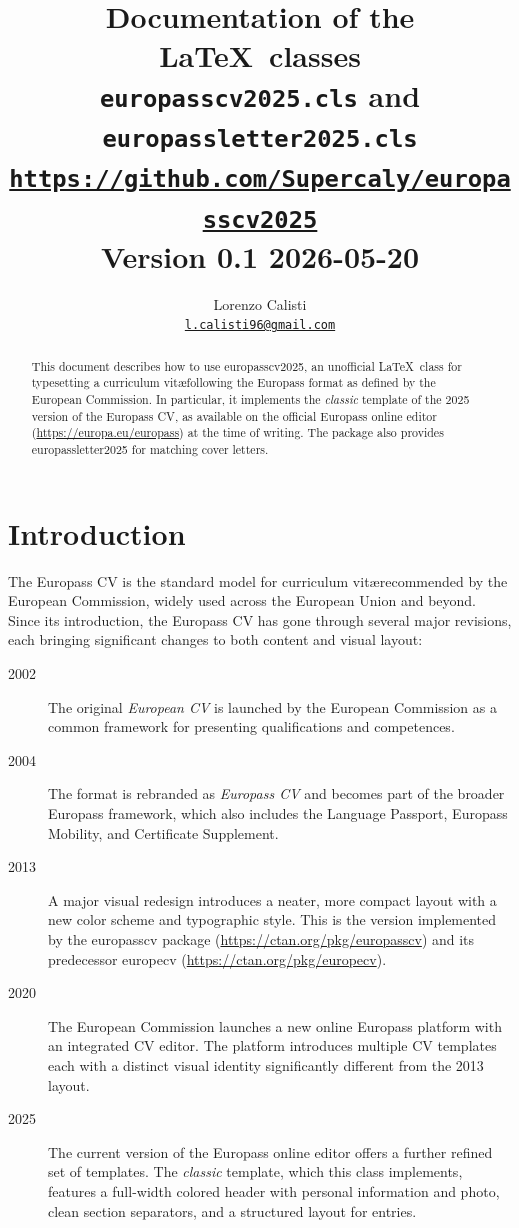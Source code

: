 \documentclass[a4paper, 12pt]{article}
\title{
    Documentation of the \LaTeX\ classes\\
    \Large\textbf{\texttt{europasscv2025.cls} and}\\
    \Large\textbf{\texttt{europassletter2025.cls}}\\
    \normalsize{\href{https://github.com/Supercaly/europasscv2025}{\texttt{https://github.com/Supercaly/europasscv2025}}}\\
    \vspace{0.2cm}\normalsize Version 0.1 2026-05-20
}
\author{
    Lorenzo Calisti\\
    \href{mailto:l.calisti96@gmail.com}{\texttt{l.calisti96@gmail.com}}
}
\newcommand{\pkg}[1]{\textsf{#1}}
\begin{document}
\maketitle
\clearpage

\begin{abstract}
This document describes how to use \pkg{europasscv2025}, an unofficial \LaTeX\ class for 
typesetting a curriculum vit\ae following the Europass format as defined by the European
Commission. In particular, it implements the \emph{classic} template of
the 2025 version of the Europass CV, as available on the official Europass
online editor (\url{https://europa.eu/europass}) at the time of writing.
The package also provides \pkg{europassletter2025} for matching cover letters.
\end{abstract}

\tableofcontents
\clearpage

\section{Introduction}

The Europass CV is the standard model for curriculum vit\ae recommended by
the European Commission, widely used across the European Union and beyond.
Since its introduction, the Europass CV has gone through several major
revisions, each bringing significant changes to both content and visual
layout:

\begin{description}
    \item[2002] The original \emph{European CV} is launched by the European
        Commission as a common framework for presenting qualifications and
        competences.
    \item[2004] The format is rebranded as \emph{Europass CV} and becomes
        part of the broader Europass framework, which also includes the
        Language Passport, Europass Mobility, and Certificate Supplement.
    \item[2013] A major visual redesign introduces a neater, more compact
        layout with a new color scheme and typographic style. This is the
        version implemented by the \pkg{europasscv} package
        (\url{https://ctan.org/pkg/europasscv}) and its predecessor
        \pkg{europecv} (\url{https://ctan.org/pkg/europecv}).
    \item[2020] The European Commission launches a new online Europass
        platform with an integrated CV editor. The platform introduces
        multiple CV templates each with a distinct visual identity significantly
        different from the 2013 layout.
    \item[2025] The current version of the Europass online editor offers
        a further refined set of templates. The \emph{classic} template,
        which this class implements, features a full-width colored header
        with personal information and photo, clean section separators, and
        a structured layout for entries.
\end{description}
\end{document}
